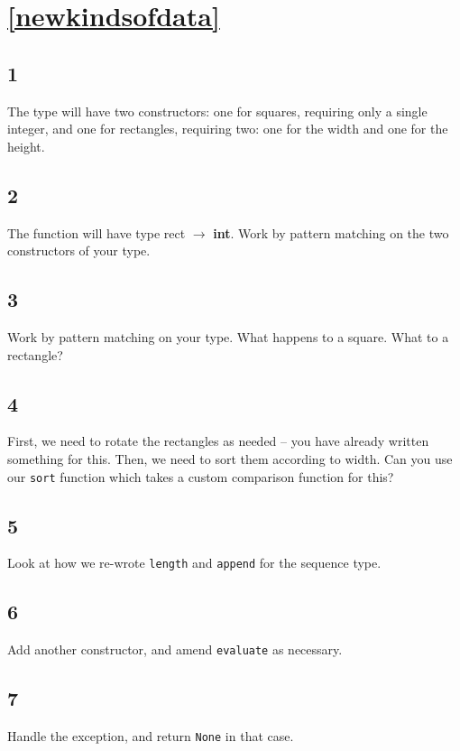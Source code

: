 \documentclass[]{book}
\begin{document}
\section*{\ref{newkindsofdata}\\ }
\subsection*{1}
The type will have two constructors: one for squares, requiring only a single integer, and one for rectangles, requiring two: one for the width and one for the height.

\subsection*{2}
The function will have type \textrm{rect $\rightarrow$ \textbf{int}}. Work by pattern matching on the two constructors of your type.

\subsection*{3}
Work by pattern matching on your type. What happens to a square. What to a rectangle?

\subsection*{4}
First, we need to rotate the rectangles as needed -- you have already written something for this. Then, we need to sort them according to width. Can you use our \texttt{sort} function which takes a custom comparison function for this?

\subsection*{5}
Look at how we re-wrote \texttt{length} and \texttt{append} for the \textrm{sequence} type.

\subsection*{6}
Add another constructor, and amend \texttt{evaluate} as necessary.

\subsection*{7}
Handle the exception, and return \texttt{None} in that case.
\end{document}
